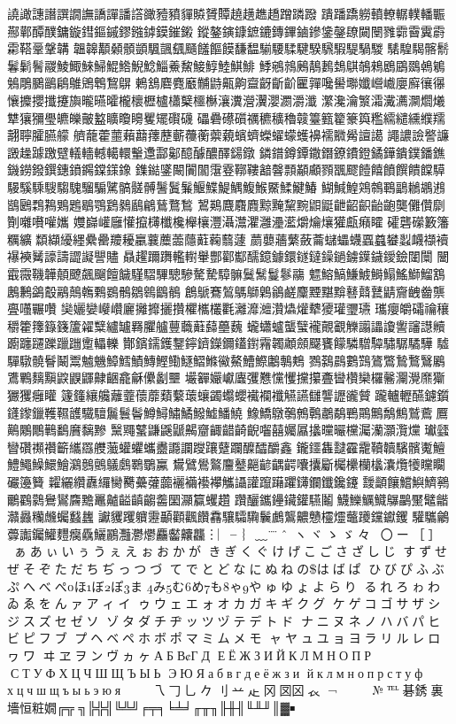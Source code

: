譊譀譓譖譔譋譕譑譂譒譗豃豷豶貚贆贇贉趬趪趭趫蹭蹸蹳
蹪蹯蹻軂轒轑轏轐轓辴酀鄿醰醭鏞鏇鏏鏂鏚鏐鏹鏬鏌鏙鎩
鏦鏊鏔鏮鏣鏕鏄鏎鏀鏒鎥鏧镽闚闛雡霩霫霬霨霦鞳鞷鞶韝
韞韟顜顙顝顗颿颽颻颾饈饇饃馦馧騚騕騥騝騤騛騢騠騧騣
騞騜騔髂鬋鬊鬎鬌鬷鯪鯫鯠鯞鯤鯦鯢鯰鯔鯗鯬鯜鯙鯥鯕鯡
鯚鵷鶁鶊鶄鶈鵱鶀鵸鶆鶋鶌鵽鵫鵴鵵鵰鵩鶅鵳鵻鶂鵯鵹鵿
鶇鵨麔麑黀黼鼭齀齁齍齖齗齘匷嚲嚵嚳壣孅巆巇廮廯忀忁
懹攗攖攕攓旟曨曣曤櫳櫰櫪櫨櫹櫱櫮櫯瀼瀵瀯瀷瀴瀱灂瀸
瀿瀺瀹瀪灀瀻瀳灁爓爔犨獽獼璺皫皪皾盭矌矎矏矍矲礥礣
礧礨礤礩禲穮穬穭竷籉籈籊籇籅糮繻繾纁纀羺翿聹臛臙艨
艩蘢藿蘁藾蘛蘀藶蘄蘉蘅蘌藽蠙蠐蠑蠗蠓蠖襣襦覹觷譠譪
譝譨譣譥譧譭趮躆躈躄轙轖轗轕轘轚邍酃酁醷醵醲醳鐋鐓
鏻鐠鐏鐔鏾鐕鐐鐨鐙鐍鏵鐀鏷鐇鐎鐖鐒鏺鐉鏸鐼鐊鏿鏼鐌
鏶鐑鐆闞闠闟霮霯鞹鞻韽韾顠顢顣顟飁飂饐饎饙饌饋饓騲
騴騱騬騪騶騩騮騸騭髇髊髆鬐鬒鬑鰋鰈鯷鰅鰒鯸鱀鰇鰎鰆
鰗鰔鰉鶟鶙鶤鶝鶒鶘鶐鶛鶠鶔鶜鶪鶗鶡鶚鶢鶨鶞鶣鶿鶩鶖
鶦鶧麙麛麚黥黤黧黦鼰鼮齛齠齞齝齙龑儺儹劘劗囃嚽嚾孈
孇巋巏廱懽攛欂櫼欃櫸欀灃灄灊灈灉灅灆爝爚爙獾甗癪矐
礭礱礯籔籓糲纊纇纈纋纆纍罍羻耰臝蘘蘪蘦蘟蘣蘜蘙蘧
蘮蘡蘠蘩蘞蘥蠩蠝蠛蠠蠤蠜蠫衊襭襩襮襫觺譹譸譅譺譻贐
贔趯躎躌轞轛轝酆酄酅醹鐿鐻鐶鐩鐽鐰鐹鐪鐷鐬鑀鐱闥闤
闣霵霺鞿韡顤飉飆飀饘饖騹騽驆驄驂驁騺騿髍鬕鬗鬘鬖鬺
魒鰫鰝鰜鰬鰣鰨鰩鰤鰡鶷鶶鶼鷁鷇鷊鷏鶾鷅鷃鶻鶵鷎鶹鶺
鶬鷈鶱鶭鷌鶳鷍鶲鹺麜黫黮黭鼛鼘鼚鼱齎齥齤龒亹囆囅囋
奱孋孌巕巑廲攡攠攦攢欋欈欉氍灕灖灗灒爞爟犩獿瓘瓕瓙
瓗癭皭礵禴穰穱籗籜籙籛籚糴糱纑罏羇臞艫蘴蘵蘳蘬蘲蘶
蠬蠨蠦蠪蠥襱覿覾觻譾讄讂讆讅譿贕躕躔躚躒躐躖躗轠轢
酇鑌鑐鑊鑋鑏鑇鑅鑈鑉鑆霿韣顪顩飋饔饛驎驓驔驌驏驈驊
驉驒驐髐鬙鬫鬻魖魕鱆鱈鰿鱄鰹鰳鱁鰼鰷鰴鰲鰽鰶鷛鷒鷞
鷚鷋鷐鷜鷑鷟鷩鷙鷘鷖鷵鷕鷝麶黰鼵鼳鼲齂齫龕龢儽劙壨
壧奲孍巘蠯彏戁戃戄攩攥斖曫欑欒欏毊灛灚爢玂玁玃癰矔
籧籦纕艬蘺虀蘹蘼蘱蘻蘾蠰蠲蠮蠳襶襴襳觾讌讎讋讈豅贙
躘轤轣醼鑢鑕鑝鑗鑞韄韅頀驖驙鬞鬟鬠鱒鱘鱐鱊鱍鱋鱕鱙
鱌鱎鷻鷷鷯鷣鷫鷸鷤鷶鷡鷮鷦鷲鷰鷢鷬鷴鷳鷨鷭黂黐黲
黳鼆鼜鼸鼷鼶齃齏齱齰齮齯囓囍孎屭攭曭曮欓灟灡灝灠爣
瓛瓥矕礸禷禶籪纗羉艭虃蠸蠷蠵衋讔讕躞躟躠躝醾醽釂鑫
鑨鑩雥靆靃靇韇韥驞髕魙鱣鱧鱦鱢鱞鱠鸂鷾鸇鸃鸆鸅鸀鸁
鸉鷿鷽鸄麠鼞齆齴齵齶囔攮斸欘欙欗欚灢爦犪矘矙礹籩籫
糶纚纘纛纙臠臡虆虇虈襹襺襼襻觿讘讙躥躤躣鑮鑭鑯鑱鑳
靉顲饟鱨鱮鱭鸋鸍鸐鸏鸒鸑麡黵鼉齇齸齻齺齹圞灦籯蠼趲
躦釃鑴鑸鑶鑵驠鬮鱴鱳鱱鱵鸔鸓黶鼊龤灨灥糷虪蠾蠽蠿
讞貜躩軉靋顳顴飌饡馫驤驦驧鬤鸕鸗齈戇欞爧虌躨钂钀钁
驩驨鸙虋讟钃鱹麷癵驫鱺鸝灩灪爩麤齾齉龘︙︳╴︴﹏¨
̈ˆ＾ヽヾゝゞ々〆〇ー［］
✽ぁあぃいぅうぇえぉおかが
きぎくぐけげこごさざしじ
すずせぜそぞただちぢっつづ
てでとどなにぬねのはばぱ
ひびぴふぶぷへべぺほぼぽま
みむめもゃやゅゆょよらり
るれろゎわゐゑをんァアィイ
ゥウェエォオカガキギクグ
ケゲコゴサザシジスズセゼソ
ゾタダチヂッツヅテデトド
ナニヌネノハバパヒビピフブ
プヘベペホボポマミムメモ
ャヤュユョヨラリルレロヮワ
ヰヱヲンヴヵヶАБВГД
ЕЁЖЗИЙКЛМНОПР
СТУФХЦЧШЩЪЫЬ
ЭЮЯабвгдеёжзи
йклмнопрстуф
хцчшщъыьэюя⇧↸
↹㇏乁𠃌乚𠂊刂䒑龰冈㘝龱𧘇
¬￢￤＇＂㈱№℡碁銹裏墻恒粧嫺╔╦
╗╠╬╣╚╩╝╒╤╕╘╧╛╓╥╖╟╫╢╙╨╜║▓￭


